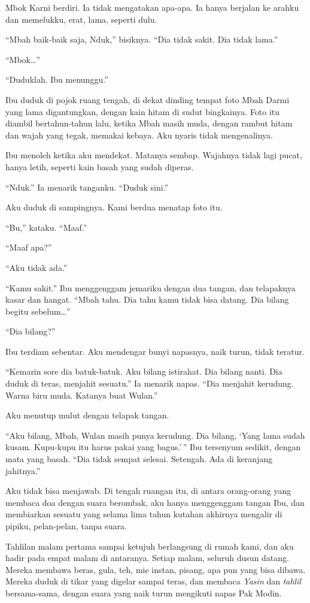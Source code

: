 \documentclass[11pt,twoside,openany]{book}
\makeatletter
\newcommand{\scenebreak}{\par\vspace{0.9em}{\centering\textsc{*\hspace{0.7em}*\hspace{0.7em}*}\par}\vspace{0.9em}\@afterindentfalse\@afterheading}
\makeatother
\begin{document}
Mbok Karni berdiri. Ia tidak mengatakan apa-apa. Ia hanya berjalan ke arahku dan memelukku, erat, lama, seperti dulu.

``Mbah baik-baik saja, Nduk,'' bisiknya. ``Dia tidak sakit. Dia tidak lama.''

``Mbok\ldots{}''

``Duduklah. Ibu menunggu.''

\scenebreak
Ibu duduk di pojok ruang tengah, di dekat dinding tempat foto Mbah Darmi yang lama digantungkan, dengan kain hitam di sudut bingkainya. Foto itu diambil bertahun-tahun lalu, ketika Mbah masih muda, dengan rambut hitam dan wajah yang tegak, memakai kebaya. Aku nyaris tidak mengenalinya.

Ibu menoleh ketika aku mendekat. Matanya sembap. Wajahnya tidak lagi pucat, hanya letih, seperti kain basah yang sudah diperas.

``Nduk.'' Ia menarik tanganku. ``Duduk sini.''

Aku duduk di sampingnya. Kami berdua menatap foto itu.

``Bu,'' kataku. ``Maaf.''

``Maaf apa?''

``Aku tidak ada.''

``Kamu sakit.'' Ibu menggenggam jemariku dengan dua tangan, dan telapaknya kasar dan hangat. ``Mbah tahu. Dia tahu kamu tidak bisa datang. Dia bilang begitu sebelum\ldots{}''

``Dia bilang?''

Ibu terdiam sebentar. Aku mendengar bunyi napasnya, naik turun, tidak teratur.

``Kemarin sore dia batuk-batuk. Aku bilang istirahat. Dia bilang nanti. Dia duduk di teras, menjahit sesuatu.'' Ia menarik napas. ``Dia menjahit kerudung. Warna biru muda. Katanya buat Wulan.''

Aku menutup mulut dengan telapak tangan.

``Aku bilang, Mbah, Wulan masih punya kerudung. Dia bilang, `Yang lama sudah kusam. Kupu-kupu itu harus pakai yang bagus.'\,'' Ibu tersenyum sedikit, dengan mata yang basah. ``Dia tidak sempat selesai. Setengah. Ada di keranjang jahitnya.''

Aku tidak bisa menjawab. Di tengah ruangan itu, di antara orang-orang yang membaca doa dengan suara berombak, aku hanya menggenggam tangan Ibu, dan membiarkan sesuatu yang selama lima tahun kutahan akhirnya mengalir di pipiku, pelan-pelan, tanpa suara.

\scenebreak
Tahlilan malam pertama sampai ketujuh berlangsung di rumah kami, dan aku hadir pada empat malam di antaranya. Setiap malam, seluruh dusun datang. Mereka membawa beras, gula, teh, mie instan, pisang, apa pun yang bisa dibawa. Mereka duduk di tikar yang digelar sampai teras, dan membaca \emph{Yasin} dan \emph{tahlil} bersama-sama, dengan suara yang naik turun mengikuti napas Pak Modin.
\end{document}
